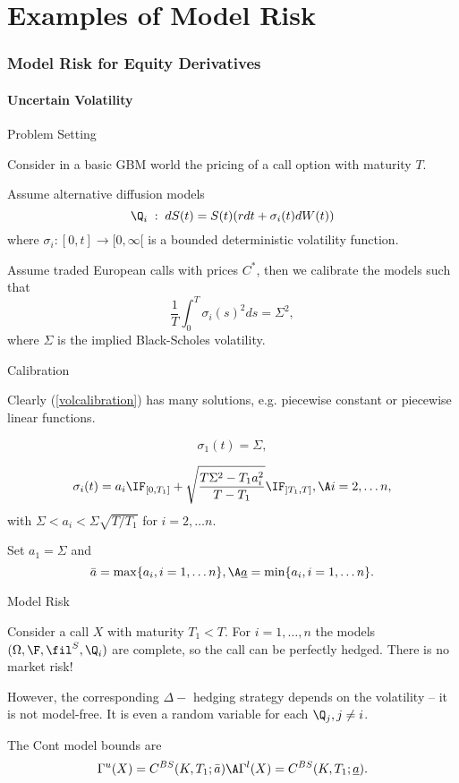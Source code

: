 
\part{Examples of Model Risk}

\section{Model Risk for Equity Derivatives}
\subsection{Uncertain Volatility}

{Problem Setting}
\item<1-> Consider in a basic GBM world the pricing of a call option with maturity $T$.
\item<2-> Assume alternative diffusion models
\begin{equation}
\Q_i\;:\; dS(t) = S(t)(r dt + \sigma_i(t) dW(t))
\end{equation}
where $ \sigma_i: [0,t] \rightarrow [0, \infty[ $ is a bounded deterministic volatility function.
\item<3->
Assume traded European calls with prices $C^*$, then we calibrate the models such that
\begin{equation}\label{volcalibration}
\frac{1}{T} \int_0^T  \sigma_i(s)^2 ds = \Sigma^2,
\end{equation}
where $\Sigma$ is the implied Black-Scholes volatility.

{Calibration}
\item<1-> Clearly (\ref{volcalibration}) has many solutions, e.g. piecewise constant or piecewise linear functions.
\item<2->
$$
\sigma_1(t) = \Sigma,
$$
\item<3->
$$
\sigma_i(t) = a_i \IF_{[0,T_1]}+ \sqrt{\frac{T\Sigma^2 -T_1a_i^2}{T-T_1}}\IF_{]T_1, T]}, \A i=2, \ldots n,
$$
with $\Sigma < a_i < \Sigma \sqrt{T/T_1}$ for  $ i =2, \ldots n$.
\item<4->
Set $a_1 = \Sigma$ and
$$
\bar{a}=\max\{a_i, i=1, \ldots n\}, \A \underline{a}=\min\{a_i, i=1, \ldots n\}.
$$

{Model Risk}
\item<1-> Consider a call $X$ with maturity $T_1 <T$. For $i=1, \ldots, n$ the models
$(\Omega, \F, \fil^S, \Q_i)$ are complete, so the call can be perfectly hedged. There is no market risk!
\item<2->
However, the corresponding $\Delta-$ hedging strategy depends on the volatility -- it is not model-free. It is even a random variable for each $\Q_j, j \not = i$.
\item<3->
The Cont model bounds are
$$
\Gamma^u(X)=C^{BS}(K, T_1; \bar{a})  \A \Gamma^l(X)=C^{BS}(K, T_1; \underline{a}).$$

